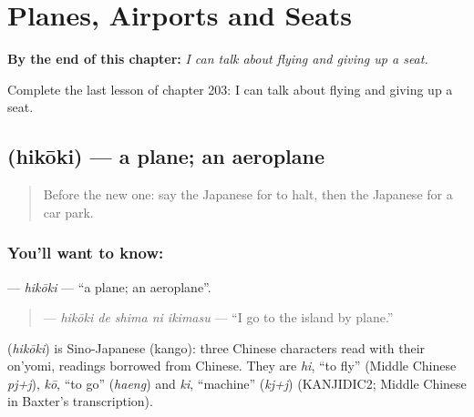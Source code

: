 
\chapter{Planes, Airports and Seats}
\label{ch:ja-planes-airports-and-seats}

\begin{chapteropening}
\textbf{By the end of this chapter:} \emph{I can talk about flying and giving up a seat.}

Complete the last lesson of chapter 203: I can talk about flying and giving up a seat.
\end{chapteropening}

\section[\texorpdfstring{\ja{ひこうき} (hikōki)}{ひこうき (hikōki)}]{ (hikōki) — a plane; an aeroplane}

\label{lesson:JA-C203-hikouki}



\begin{quote}
Before the new one: say the Japanese for to halt, then the Japanese for a car park.
\end{quote}

\subsection*{You'll want to know: }
\textbf{} — \emph{hikōki} — \textquotedblleft{}a plane; an aeroplane\textquotedblright{}.

\begin{quote}
\textbf{  } — \emph{hikōki de shima ni ikimasu} — \textquotedblleft{}I go to the island by plane.\textquotedblright{}
\end{quote}

\begin{cousinweb}
\textbf{} (\emph{hikōki}) is Sino-Japanese (kango): three Chinese characters read with their on'yomi, readings borrowed from Chinese. They are \emph{hi}, \textquotedblleft{}to fly\textquotedblright{} (Middle Chinese \emph{pj+j}), \emph{kō}, \textquotedblleft{}to go\textquotedblright{} (\emph{haeng}) and \emph{ki}, \textquotedblleft{}machine\textquotedblright{} (\emph{kj+j}) (KANJIDIC2; Middle Chinese in Baxter's transcription).
\end{cousinweb}

